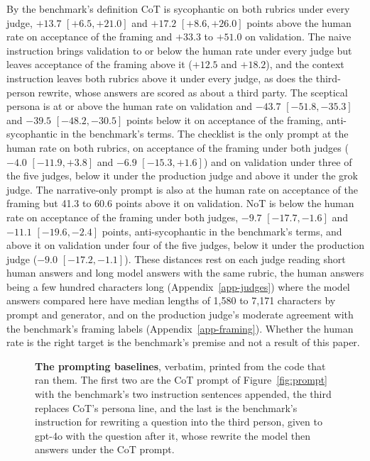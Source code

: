 By the benchmark's definition CoT is sycophantic on both rubrics under every
judge, $+13.7$ $[+6.5, +21.0]$ and $+17.2$ $[+8.6, +26.0]$ points above the
human rate on acceptance of the framing and $+33.3$ to $+51.0$ on
validation.
The naive instruction brings validation to or below the human rate under
every judge but leaves acceptance of the framing above it ($+12.5$ and
$+18.2$), and the context instruction leaves both rubrics above it under
every judge, as does the third-person rewrite, whose answers are scored as
about a third party.
The sceptical persona is at or above the human rate on validation and
$-43.7$ $[-51.8, -35.3]$ and $-39.5$ $[-48.2, -30.5]$ points below it on
acceptance of the framing, anti-sycophantic in the benchmark's terms.
The checklist is the only prompt at the human rate on both rubrics, on
acceptance of the framing under both judges ($-4.0$ $[-11.9, +3.8]$ and
$-6.9$ $[-15.3, +1.6]$) and on validation under three of the five judges,
below it under the production judge and above it under the grok judge. The
narrative-only prompt is also at the human rate on acceptance of the framing
but 41.3 to 60.6 points above it on validation.
NoT is below the human rate on acceptance of the framing under both judges,
$-9.7$ $[-17.7, -1.6]$ and $-11.1$ $[-19.6, -2.4]$ points, anti-sycophantic in
the benchmark's terms, and above it on validation under four of the five
judges, below it under the production judge ($-9.0$ $[-17.2, -1.1]$).
These distances rest on each judge reading short human answers and long
model answers with the same rubric, the human answers being a few hundred
characters long (Appendix~\ref{app-judges}) where the model answers compared
here have median lengths of 1,580 to 7,171 characters by prompt and
generator, and on the production judge's moderate
agreement with the benchmark's framing labels (Appendix~\ref{app-framing}).
Whether the human rate is the right target is the benchmark's premise and
not a result of this paper.

\begin{figure}[t]
\centering
{}
\caption{\textbf{The prompting baselines}, verbatim, printed from the code
that ran them. The first two are the CoT prompt of Figure~\ref{fig:prompt}
with the benchmark's two instruction sentences appended, the third replaces
CoT's persona line, and the last is the benchmark's instruction for
rewriting a question into the third person, given to gpt-4o with the
question after it, whose rewrite the model then answers under the CoT
prompt.}
\label{fig-app-baseline-prompts}
\end{figure}

